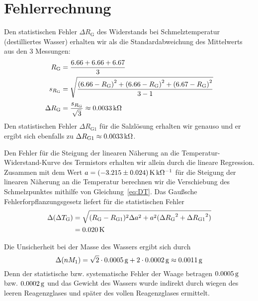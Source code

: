 \section{Fehlerrechnung}
\newcommand{\rg}{R_\mathrm{G}} %
\newcommand{\stat}{\Delta} %

Den statistischen Fehler $\Delta \rg$ des Widerstands bei Schmelztemperatur (destilliertes Wasser) erhalten wir als die Standardabweichung des Mittelwerts aus den 3 Messungen:
%
\begin{align*}
            \rg &= \frac{6.66 + 6.66 + 6.67}{3} \\
        s_{\rg} &= \sqrt{\frac{\left(6.66 - \rg\right)^2 + \left(6.66 - \rg\right)^2 + \left(6.67 - \rg\right)^2}{3 - 1}} \\[1mm]
    \stat \rg  &= \frac{s_{\rg}}{\sqrt{3}} \approx \unit[0.0033]{k\Omega}
\end{align*}
%
Den statistischen Fehler $\stat R_\mathrm{G1}$ für die Salzlösung erhalten wir genauso und er ergibt sich ebenfalls zu $\Delta R_\mathrm{G1} \approx \unit[0.0033]{k\Omega}$.

Den Fehler für die Steigung der linearen Näherung an die Temperatur-Widerstand-Kurve des Termistors erhalten wir allein durch die lineare Regression.
%
Zusammen mit dem Wert $a = \unit[(-3.215 \pm 0.024)]{K\, k\Omega^{-1}}$ für die Steigung der linearen Näherung an die Temperatur berechnen wir die Verschiebung des Schmelzpunktes mithilfe von Gleichung~\ref{eq:DT}. Das Gaußsche Fehlerforpflanzungsgesetz liefert für die statistischen Fehler
%
\begin{align*}
    \stat(\Delta T_\mathrm{G}) &= \sqrt{(R_\mathrm{G} - R_\mathrm{G1})^2 \stat a^2 +
                                                      a^2 (\stat {R_\mathrm{G}}^2 + \stat {R_\mathrm{G1}}^2)} \\
                                              &= \unit[0.020]{K}
\end{align*}
%

Die Unsicherheit bei der Masse des Wassers ergibt sich durch
\[
    \stat(n M_1) = \sqrt{2} \cdot \unit[0.0005]{g} + 2 \cdot \unit[0.0002]{g} \approx \unit[0.0011]{g}
\]
Denn der statistische bzw. systematische Fehler der Waage betragen $\unit[0.0005]{g}$ bzw. $\unit[0.0002]{g}$ und das Gewicht des Wassers wurde indirekt durch wiegen des leeren Reagenzglases und später des vollen Reagenzglases ermittelt.

